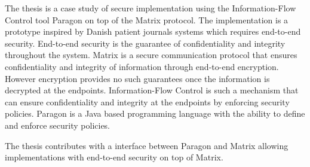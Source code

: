 
The thesis is a case study of secure implementation using the Information-Flow Control tool Paragon on top of the Matrix protocol. The implementation is a prototype inspired by Danish patient journals systems which requires end-to-end security. End-to-end security is the guarantee of confidentiality and integrity throughout the system. Matrix is a secure communication protocol that ensures confidentiality and integrity of information through end-to-end encryption. However encryption provides no such guarantees once the information is decrypted at the endpoints. Information-Flow Control is such a mechanism that can ensure confidentiality and integrity at the endpoints by enforcing security policies. Paragon is a Java based programming language with the ability to define and enforce security policies.

The thesis contributes with a interface between Paragon and Matrix allowing implementations with end-to-end security on top of Matrix.



